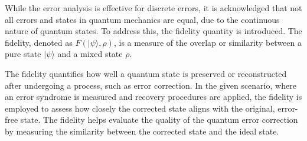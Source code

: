 \documentclass[12pt]{report}
\begin{document}
\begin{minipage}{1 \textwidth}
		While the error analysis is effective for discrete errors, it is acknowledged that not all errors and states in quantum mechanics are equal, due to the continuous nature of quantum states. To address this, the fidelity quantity is introduced. \newline
		The fidelity, denoted as $F(|\psi \rangle, \rho)$, is a measure of the overlap or similarity between a pure state $| \psi \rangle$  and a mixed state $\rho$. \newline
		
		The fidelity quantifies how well a quantum state is preserved or reconstructed after undergoing a process, such as error correction. 
		In the given scenario, where an error syndrome is measured and recovery procedures are applied, the fidelity is employed to assess how closely the corrected state aligns with the original, error-free state. 
		The fidelity helps evaluate the quality of the quantum error correction by measuring the similarity between the corrected state and the ideal state. \newline
		
		
		
	\end{minipage}
	
\end{document}
